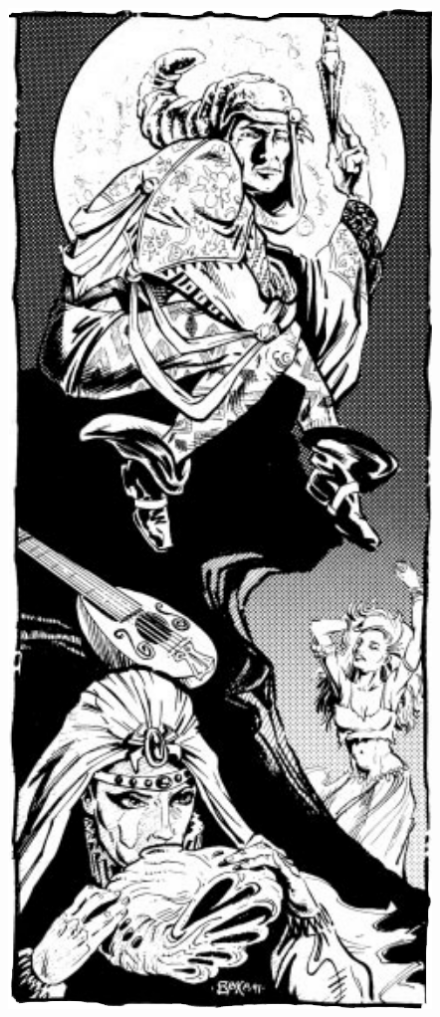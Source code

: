 \begin{figure}[t!]
\centering
\includegraphics[width=\columnwidth]{images/bard-1.png}
\WOTC
\end{figure}

